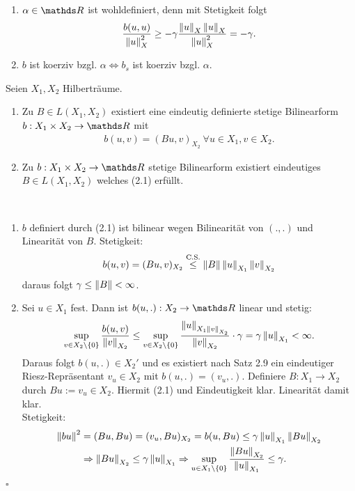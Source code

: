 \begin{enumerate}[(1)]
	\item $\alpha \in\R$ ist wohldefiniert, denn mit Stetigkeit folgt
	\[
	\frac{b(u,u)}{\left\Vert u\right\Vert_X^2} \ge -\gamma \frac{\left\Vert u\right\Vert_X\left\Vert u\right\Vert_X}{\left\Vert u\right\Vert_X^2} = -\gamma.
	\]
	\item $b$ ist koerziv bzgl. $\alpha \Leftrightarrow b_s$ ist koerziv bzgl. $\alpha$.
\end{enumerate}

Seien $X_1,X_2$ Hilberträume.
\begin{enumerate}[(1)]
	\item Zu $B\in L(X_1,X_2)$ existiert eine eindeutig definierte stetige Bilinearform $b:X_1\times X_2\to \R$ mit 
	\begin{align}
	b(u,v) = (Bu,v)_{X_2} ~\forall u\in X_1,v\in X_2.
	\end{align}
	\item Zu $b:X_1\times X_2 \to \R$ stetige Bilinearform existiert eindeutiges $B\in L(X_1,X_2)$ welches (2.1) erfüllt.
\end{enumerate}

\\
\begin{enumerate}[(1)]
	\item $b$ definiert durch (2.1) ist bilinear wegen Bilinearität von $(.,.)$ und Linearität von $B$.
	Stetigkeit:
	\[
	b(u,v) = (Bu,v)_{X_2} \stackrel{\text{C.S.}}{\le} \left\Vert B\right\Vert\left\Vert u\right\Vert_{X_1}\left\Vert v\right\Vert_{X_2}
	\]
	daraus folgt $\gamma \le \left\Vert B\right\Vert < \infty$.
	\item Sei $u\in X_1$ fest.
	Dann ist $b(u,.):X_2\to\R$ linear und stetig:
	\[
	\sup\limits_{v\in X_2\backslash\{0\}} \frac{b(u,v)}{\left\Vert v\right\Vert_{X_2}} \le \sup\limits_{v\in X_2\backslash\{0\}} \frac{\left\Vert u\right\Vert_{X_1\left\Vert v\right\Vert_{X_2}}}{\left\Vert v\right\Vert_{X_2}}\cdot \gamma = \gamma \left\Vert u\right\Vert_{X_1} < \infty.
	\]
	Daraus folgt $b(u,.)\in X_2'$ und es existiert nach Satz 2.9 ein eindeutiger Riesz-Repräsentant $v_u\in X_2$ mit $b(u,.) = (v_u,.)$.
	Definiere $B:X_1\to X_2$ durch $Bu := v_u\in X_2$.
	Hiermit (2.1) und Eindeutigkeit klar.
	Linearität damit klar.\\
	Stetigkeit:
	\begin{align*}
	\left\Vert bu\right\Vert^2 &= (Bu,Bu) = (v_u,Bu)_{X_2} = b(u,Bu) \le \gamma \left\Vert u\right\Vert_{X_1}\left\Vert Bu\right\Vert_{X_2}\\
	&\Rightarrow \left\Vert Bu\right\Vert_{X_2} \le \gamma \left\Vert u\right\Vert_{X_1} \Rightarrow \sup\limits_{u\in X_1\backslash\{0\}} \frac{\left\Vert Bu\right\Vert_{X_2}}{\left\Vert u\right\Vert_{X_1}} \le \gamma.
	\end{align*}
\end{enumerate}
\hfill $\square$\\


